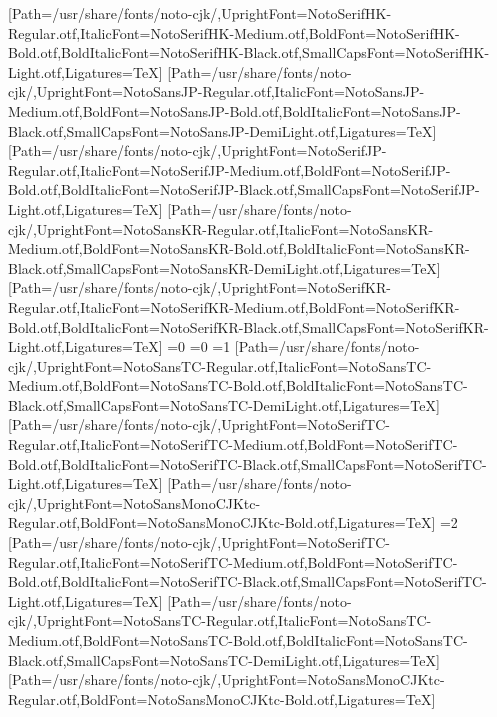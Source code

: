 \newfontfamily{}[Path=/usr/share/fonts/noto-cjk/,UprightFont=NotoSerifHK-Regular.otf,ItalicFont=NotoSerifHK-Medium.otf,BoldFont=NotoSerifHK-Bold.otf,BoldItalicFont=NotoSerifHK-Black.otf,SmallCapsFont=NotoSerifHK-Light.otf,Ligatures=TeX]
\newfontfamily{}[Path=/usr/share/fonts/noto-cjk/,UprightFont=NotoSansJP-Regular.otf,ItalicFont=NotoSansJP-Medium.otf,BoldFont=NotoSansJP-Bold.otf,BoldItalicFont=NotoSansJP-Black.otf,SmallCapsFont=NotoSansJP-DemiLight.otf,Ligatures=TeX]
\newfontfamily{}[Path=/usr/share/fonts/noto-cjk/,UprightFont=NotoSerifJP-Regular.otf,ItalicFont=NotoSerifJP-Medium.otf,BoldFont=NotoSerifJP-Bold.otf,BoldItalicFont=NotoSerifJP-Black.otf,SmallCapsFont=NotoSerifJP-Light.otf,Ligatures=TeX]
\newfontfamily{}[Path=/usr/share/fonts/noto-cjk/,UprightFont=NotoSansKR-Regular.otf,ItalicFont=NotoSansKR-Medium.otf,BoldFont=NotoSansKR-Bold.otf,BoldItalicFont=NotoSansKR-Black.otf,SmallCapsFont=NotoSansKR-DemiLight.otf,Ligatures=TeX]
\newfontfamily{}[Path=/usr/share/fonts/noto-cjk/,UprightFont=NotoSerifKR-Regular.otf,ItalicFont=NotoSerifKR-Medium.otf,BoldFont=NotoSerifKR-Bold.otf,BoldItalicFont=NotoSerifKR-Black.otf,SmallCapsFont=NotoSerifKR-Light.otf,Ligatures=TeX]
\fi\fi\fi\fi\fi\fi\fi
\else
\ifnum\value{CJKFonts}=0\else
\ifnum\value{CJKLanguage}=0
\ifnum\value{CJKFonts}=1
[Path=/usr/share/fonts/noto-cjk/,UprightFont=NotoSansTC-Regular.otf,ItalicFont=NotoSansTC-Medium.otf,BoldFont=NotoSansTC-Bold.otf,BoldItalicFont=NotoSansTC-Black.otf,SmallCapsFont=NotoSansTC-DemiLight.otf,Ligatures=TeX]
[Path=/usr/share/fonts/noto-cjk/,UprightFont=NotoSerifTC-Regular.otf,ItalicFont=NotoSerifTC-Medium.otf,BoldFont=NotoSerifTC-Bold.otf,BoldItalicFont=NotoSerifTC-Black.otf,SmallCapsFont=NotoSerifTC-Light.otf,Ligatures=TeX]
[Path=/usr/share/fonts/noto-cjk/,UprightFont=NotoSansMonoCJKtc-Regular.otf,BoldFont=NotoSansMonoCJKtc-Bold.otf,Ligatures=TeX]
\else\ifnum\value{CJKFonts}=2
[Path=/usr/share/fonts/noto-cjk/,UprightFont=NotoSerifTC-Regular.otf,ItalicFont=NotoSerifTC-Medium.otf,BoldFont=NotoSerifTC-Bold.otf,BoldItalicFont=NotoSerifTC-Black.otf,SmallCapsFont=NotoSerifTC-Light.otf,Ligatures=TeX]
[Path=/usr/share/fonts/noto-cjk/,UprightFont=NotoSansTC-Regular.otf,ItalicFont=NotoSansTC-Medium.otf,BoldFont=NotoSansTC-Bold.otf,BoldItalicFont=NotoSansTC-Black.otf,SmallCapsFont=NotoSansTC-DemiLight.otf,Ligatures=TeX]
[Path=/usr/share/fonts/noto-cjk/,UprightFont=NotoSansMonoCJKtc-Regular.otf,BoldFont=NotoSansMonoCJKtc-Bold.otf,Ligatures=TeX]
